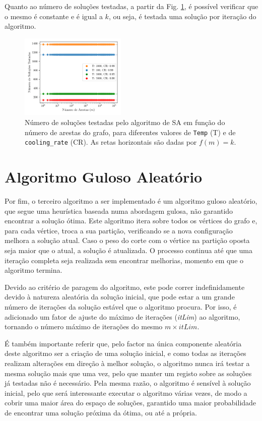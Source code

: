 \documentclass[mirror, portugues]{revdetua}
\begin{document}
Quanto ao número de soluções testadas, a partir da Fig. \ref{fig:sols_satested}, é possível verificar que o mesmo é constante e é igual a $k$, ou seja, é testada uma solução por iteração do algoritmo.

\begin{figure}[H]
    \centering
    \includegraphics[width=0.45\textwidth]{../assets/sols_Simulated .png}
    \caption{Número de soluções testadas pelo algoritmo de SA em função do número de arestas do grafo, para diferentes valores de \texttt{Temp} (T) e de \texttt{cooling\_rate} (CR). As retas horizontais são dadas por $f(m) = k$.}
    \label{fig:sols_satested}
\end{figure}

\section{Algoritmo Guloso Aleatório}

Por fim, o terceiro algoritmo a ser implementado é um algoritmo guloso aleatório, que segue uma heurística baseada numa abordagem gulosa, não garantido encontrar a solução ótima. Este algoritmo itera sobre todos os vértices do grafo e, para cada vértice, troca a sua partição, verificando se a nova configuração melhora a solução atual. Caso o peso do corte com o vértice na partição oposta seja maior que o atual, a solução é atualizada. O processo continua até que uma iteração completa seja realizada sem encontrar melhorias, momento em que o algoritmo termina.

Devido ao critério de paragem do algoritmo, este pode correr indefinidamente devido à natureza aleatória da solução inicial, que pode estar a um grande número de iterações da solução estável que o algoritmo procura. Por isso, é adicionado um fator de ajuste do máximo de iterações (\textit{itLim}) ao algoritmo, tornando o número máximo de iterações do mesmo $m \times itLim$.

É também importante referir que, pelo factor na única componente aleatória deste algoritmo ser a criação de uma solução inicial, e como todas as iterações realizam alterações em direção à melhor solução, o algoritmo nunca irá testar a mesma solução mais que uma vez, pelo que manter um registo sobre as soluções já testadas não é necessário. Pela mesma razão, o algoritmo é sensível à solução inicial, pelo que será interessante executar o algoritmo várias vezes, de modo a cobrir uma maior área do espaço de soluções, garantido uma maior probabilidade de encontrar uma solução próxima da ótima, ou até a própria.
\end{document}
